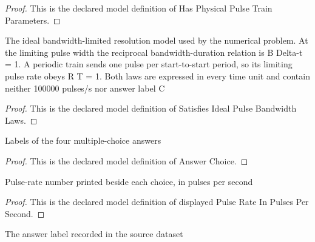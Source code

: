 \begin{proof}
  This is the declared model definition of Has Physical Pulse Train Parameters.
\end{proof}
\begin{definition}
  \label{def:physics:phyx-mini-0504:phyxminiproblems-problemphyxmini0504-satisfiesidealpulsebandwidthlaws}
  The ideal bandwidth-limited resolution model used by the numerical problem. At the limiting pulse width the reciprocal bandwidth-duration relation is B Delta-t = 1. A periodic train sends one pulse per start-to-start period, so its limiting pulse rate obeys R T = 1. Both laws are expressed in every time unit and contain neither 100000 pulses/s nor answer label C
\end{definition}
\begin{proof}
  This is the declared model definition of Satisfies Ideal Pulse Bandwidth Laws.
\end{proof}
\begin{definition}
  \label{def:physics:phyx-mini-0504:phyxminiproblems-problemphyxmini0504-answerchoice}
  Labels of the four multiple-choice answers
\end{definition}
\begin{proof}
  This is the declared model definition of Answer Choice.
\end{proof}
\begin{definition}
  \label{def:physics:phyx-mini-0504:phyxminiproblems-problemphyxmini0504-displayedpulserateinpulsespersecond}
  Pulse-rate number printed beside each choice, in pulses per second
\end{definition}
\begin{proof}
  This is the declared model definition of displayed Pulse Rate In Pulses Per Second.
\end{proof}
\begin{definition}
  \label{def:physics:phyx-mini-0504:phyxminiproblems-problemphyxmini0504-recordeddatasetanswer}
  The answer label recorded in the source dataset
\end{definition}

